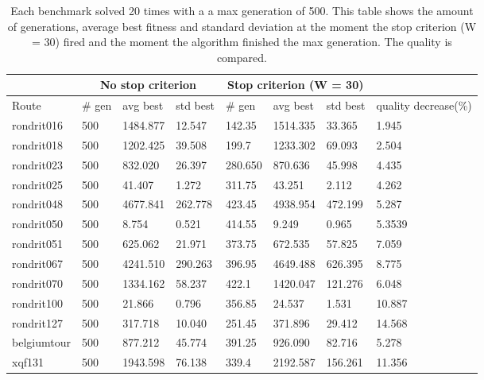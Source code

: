 \begin{table}[ht!]
    \centering
    \begin{tabular}{ | l || l | l | l || l | l | l || l | }
    \hline
     & \multicolumn{3}{|c|}{No stop criterion} & \multicolumn{3}{|c|}{Stop criterion (W = 30)} & \\
    \hline
	Route & \# gen & avg best & std best & \# gen & avg best & std best & quality decrease(\%) \\ \hline
	rondrit016 & 500 & 1484.877 & 12.547 & 142.35 & 1514.335 & 33.365 & 1.945 \\ \hline
	rondrit018 & 500 & 1202.425 & 39.508 & 199.7 & 1233.302 & 69.093 & 2.504 \\ \hline
	rondrit023 & 500 & 832.020 & 26.397 & 280.650 & 870.636 & 45.998 & 4.435 \\ \hline
	rondrit025 & 500 & 41.407 & 1.272 & 311.75 & 43.251 & 2.112 & 4.262 \\ \hline
	rondrit048 & 500 & 4677.841 & 262.778 & 423.45 & 4938.954 & 472.199 & 5.287 \\ \hline
	rondrit050 & 500 & 8.754 & 0.521 & 414.55 & 9.249 & 0.965 & 5.3539 \\ \hline
	rondrit051 & 500 & 625.062 & 21.971 & 373.75 & 672.535 & 57.825 & 7.059 \\ \hline
	rondrit067 & 500 & 4241.510 & 290.263 & 396.95 & 4649.488 & 626.395 & 8.775 \\ \hline
	rondrit070 & 500 & 1334.162 & 58.237 & 422.1 & 1420.047 & 121.276 & 6.048 \\ \hline
	rondrit100 & 500 & 21.866 & 0.796 & 356.85 & 24.537 & 1.531 & 10.887 \\ \hline
	rondrit127 & 500 & 317.718 & 10.040 & 251.45 & 371.896 & 29.412 & 14.568 \\ \hline
	belgiumtour & 500 & 877.212 & 45.774 & 391.25 & 926.090 & 82.716 & 5.278 \\ \hline
	xqf131 & 500 & 1943.598 & 76.138 & 339.4 & 2192.587 & 156.261 & 11.356 \\ \hline
    \end{tabular}
    \caption{Each benchmark solved 20 times with a a max generation of 500. This table shows the amount of generations, average best fitness and standard deviation at the moment the stop criterion (W = 30) fired and the moment the algorithm finished the max generation. The quality is compared.}
    \label{tab:window30}
\end{table}

